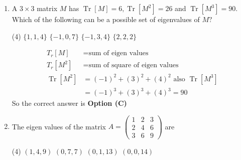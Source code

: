 \begin{enumerate}[label=\color{ocre}\textbf{\arabic*.}]
\begin{answer}
\begin{align*}
	\intertext{We know that}
	e^x&=1+x+\frac{x^2}{2!}+\frac{x^3}{3!}+.....\\
	e^M&=1+M+\frac{M^2}{2!}+\frac{M^3}{3!}+.....\\
	M&=\left[\begin{array}{lll}1 & 1 & 1 \\ 1 & 1 & 1 \\ 1 & 1 & 1\end{array}\right] \Rightarrow M^{2} =\left[\begin{array}{lll}3 & 3 & 3 \\ 3 & 3 & 3 \\ 3 & 3 & 3\end{array}\right]=3 M\\
	\text{similarly}\quad M^{3}&=9 M=3^{2} M
	\intertext{we can rewrite $e^M$ as,}
	e^{M}&=I+M+\frac{3 M}{2 !}+\frac{3^{2} M}{3 !}+\frac{3^{3} M}{4 !}+\cdots\\
	&=I+\frac{M}{3}\left[3+\frac{3^{2}}{2 !}+\frac{3^{3}}{3 !}+\frac{3^{4}}{4 !}+\cdots\right]\\
	&=I+\frac{M}{3}\left[e^{3}-1\right]
		\end{align*}
	\end{answer}
	\item A $3 \times 3$ matrix $M$ has $\operatorname{Tr}[M]=6, \operatorname{Tr}\left[M^{2}\right]=26$ and $\operatorname{Tr}\left[M^{3}\right]=90$. Which of the following can be a possible set of eigenvalues of $M ?$
	{}
\begin{tasks}(4)
\task[\textbf{A.}] $\{1,1,4\}$
\task[\textbf{B.}] $\{-1,0,7\}$
\task[\textbf{C.}] $\{-1,3,4\}$
\task[\textbf{D.}] $\{2,2,2\}$
\end{tasks}
\begin{answer}
\begin{align*}
T_r[M]&=\text{sum of eigen values}\\
T_r[M^2]&=\text{sum of square of eigen values}\\
\operatorname{Tr}\left[M^{2}\right]&=(-1)^{2}+(3)^{2}+(4)^{2}\text{ also } \operatorname{Tr}\left[M^{3}\right]\\&=(-1)^{3}+(3)^{3}+(4)^{3}=90
\end{align*}
So the correct answer is \textbf{Option (C)}
\end{answer}
\item The eigen values of the matrix $A=\left(\begin{array}{lll}1 & 2 & 3 \\ 2 & 4 & 6 \\ 3 & 6 & 9\end{array}\right)$ are
{}
\begin{tasks}(4)
	\task[\textbf{A.}] $(1,4,9)$
	\task[\textbf{B.}] $(0,7,7)$
	\task[\textbf{C.}] $(0,1,13)$
	\task[\textbf{D.}] $(0,0,14)$
\end{tasks}
\begin{answer}
	 

\end{answer}
\end{enumerate}

